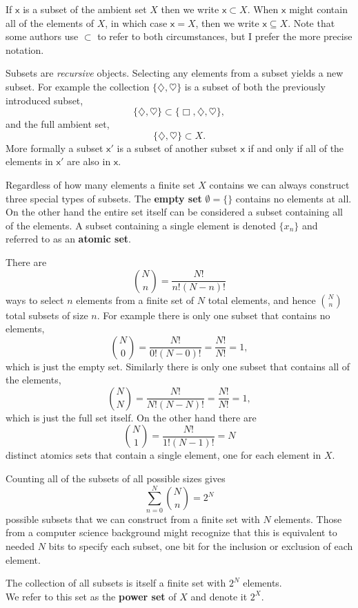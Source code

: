 \documentclass[
  letterpaper,
  DIV=11,
  numbers=noendperiod]{scrartcl}
\begin{document}
If \(\mathsf{x}\) is a subset of the ambient set \(X\) then we write
\(\mathsf{x} \subset X\). When \(\mathsf{x}\) might contain all of the
elements of \(X\), in which case \(\mathsf{x} = X\), then we write
\(\mathsf{x} \subseteq X\). Note that some authors use \(\subset\) to
refer to both circumstances, but I prefer the more precise notation.

Subsets are \emph{recursive} objects. Selecting any elements from a
subset yields a new subset. For example the collection
\(\{\diamondsuit, \heartsuit\}\) is a subset of both the previously
introduced subset, \[
\{ \diamondsuit, \heartsuit \} \subset \{ \Box, \diamondsuit, \heartsuit \},
\] and the full ambient set, \[
\{ \diamondsuit, \heartsuit \} \subset X.
\] More formally a subset \(\mathsf{x}'\) is a subset of another subset
\(\mathsf{x}\) if and only if all of the elements in \(\mathsf{x}'\) are
also in \(\mathsf{x}\).

Regardless of how many elements a finite set \(X\) contains we can
always construct three special types of subsets. The \textbf{empty set}
\(\emptyset = \{\}\) contains no elements at all. On the other hand the
entire set itself can be considered a subset containing all of the
elements. A subset containing a single element is denoted
\(\{ x_{n} \}\) and referred to as an \textbf{atomic set}.

There are \[
{N \choose n} = \frac{ N! }{ n! (N - n)!}
\] ways to select \(n\) elements from a finite set of \(N\) total
elements, and hence \({N \choose n}\) total subsets of size \(n\). For
example there is only one subset that contains no elements, \[
{N \choose 0} = \frac{ N! }{ 0! (N - 0)!} = \frac{ N! }{ N! } = 1,
\] which is just the empty set. Similarly there is only one subset that
contains all of the elements, \[
{N \choose N} = \frac{ N! }{ N! (N - N)!} = \frac{ N! }{ N! } = 1,
\] which is just the full set itself. On the other hand there are \[
{N \choose 1} = \frac{ N! }{ 1! (N - 1)!} = N
\] distinct atomics sets that contain a single element, one for each
element in \(X\).

Counting all of the subsets of all possible sizes gives \[
\sum_{n = 0}^{N} {N \choose n} = 2^{N}
\] possible subsets that we can construct from a finite set with \(N\)
elements. Those from a computer science background might recognize that
this is equivalent to needed \(N\) bits to specify each subset, one bit
for the inclusion or exclusion of each element.

The collection of all subsets is itself a finite set with \(2^{N}\)
elements.\\
We refer to this set as the \textbf{power set} of \(X\) and denote it
\(2^{X}\).
\end{document}
